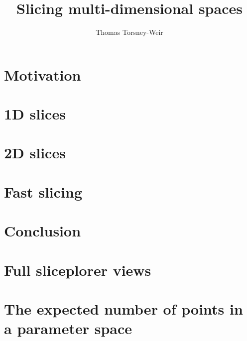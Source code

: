\documentclass[a4paper,12pt]{memoir}
\title{Slicing multi-dimensional spaces}
\author{Thomas Torsney-Weir}
\date{}
\begin{document}
\DoubleSpacing

\maketitle

\listoffixmes

\tableofcontents

\chapter{Motivation}
\label{chp:motivation}


%

\chapter{1D slices}
\label{chp:sliceplorer}


\chapter{2D slices}
\label{chp:hypersliceplorer}


\chapter{Fast slicing}
\label{chp:rendering}


\chapter{Conclusion}
\label{chp:conclusion}


\begin{appendices}

\chapter{Full sliceplorer views}
\label{ax:sliceplorer_ml}


\chapter{The expected number of points in a \mbox{parameter} space}
\label{ax:rt_proof}


\end{appendices}



\end{document}
